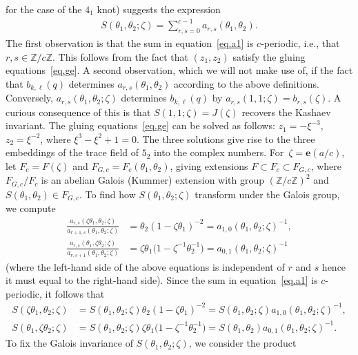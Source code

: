\documentclass[pdftex]{sigma}
\numberwithin{equation}{section}
\def\BZ{\mathbb Z}
\def\z{\zeta}
\def\e{\mathbf{e}}
\def\e{\mathbf{e}}
\def\z{\zeta}
\def\J{\mathbf J} \def\J{J} %
\def\th{\theta}
\begin{document}
for the case of the $4_1$ knot) suggests the expression
\begin{align}
\label{eq.a1}
S(\th_1,\th_2;\zeta)=\sum_{r,s=0}^{c-1} a_{r,s}(\th_1,\th_2) .
\end{align}
The first observation is that the sum in equation~\eqref{eq.a1} is
$c$-periodic, i.e., that $r,s \in \BZ/c\BZ$.
This follows from the fact that $(z_1,z_2)$ satisfy the gluing
equations~\eqref{eq.ge}. A second observation, which we will not make use of,
if the fact that $b_{k,\ell}(q)$ determines $a_{r,s}(\th_1,\th_2)$ according to
the above definitions. Conversely, $a_{r,s}(\th_1,\th_2;\z)$ determines
$b_{k,\ell}(q)$ by $a_{r,s}(1,1;\z)=b_{r,s}(\zeta) $.
A curious consequence of this is that $
S(1,1;\z)=\J(\z)$
recovers the Kashaev invariant.
The gluing equations~\eqref{eq.ge} can be solved as follows: $z_1=-\xi^{-3}$, $z_2=\xi^{-2}$,
where $\xi^3-\xi^2+1=0$. The three solutions give rise to the three
embeddings of the trace field of $5_2$ into the complex numbers.
For~${\z=\e(a/c)}$, let $F_c=F(\z)$ and $F_{G,c}=F_c(\th_1,\th_2)$,
giving extensions $
F \subset F_c \subset F_{G,c}$,
where~$F_{G,c}/F_c$ is an abelian Galois (Kummer) extension with group $(\BZ/c\BZ)^2$
and $S(\th_1,\th_2) \in F_{G,c}$. To find how $S(\th_1,\th_2;\z)$
transform under the Galois group, we compute
\begin{align*}%
 \frac{a_{r,s}(\zeta \th_1,\th_2;\z)}{a_{r+1,s}(\th_1,\th_2;\z)}
 &= \th_2 (1-\zeta \th_1)^{-2} = a_{1,0}(\th_1,\th_2;\z)^{-1},\\
 \frac{a_{r,s}(\th_1,\zeta \th_2;\z)}{a_{r,s+1}(\th_1,\th_2;\z)}
 &= \zeta \th_1\big(1-\zeta^{-1}\th_2^{-1}\big) = a_{0,1}(\th_1,\th_2;\z)^{-1}
\end{align*}
(where the left-hand side of the above equations is independent of
$r$ and $s$ hence it must equal to the right-hand side).
Since the sum in equation~\eqref{eq.a1} is $c$-periodic, it follows that
\begin{subequations}\label{eq.Sq1Sq2}
\begin{align}
\label{eq.Sq1}
 S(\zeta \th_1,\th_2;\z) &= S(\th_1,\th_2;\z) \th_2 (1-\zeta \th_1)^{-2}
 = S(\th_1,\th_2;\z)a_{1,0}(\th_1,\th_2;\z)^{-1},\\
\label{eq.Sq2}
 S(\th_1, \zeta \th_2;\z) &= S(\th_1,\th_2;\z) \zeta \th_1 \big(1-\zeta^{-1} \th_2^{-1}\big)
 =S(\th_1,\th_2)a_{0,1}(\th_1,\th_2;\z)^{-1}.
\end{align}
\end{subequations}
To fix the Galois invariance of $S(\th_1,\th_2;\z)$, we consider the product
\end{document}
